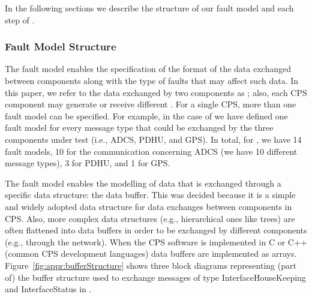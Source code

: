 
In the following sections we describe the structure of our fault model and each step of \APPR.



\subsubsection{Fault Model Structure}
\label{sec:faultModelStructure}





The \APPR fault model enables the specification of the format of the data exchanged between components along with the type of faults that may affect such data. 
In this paper, we refer to the data exchanged by two components as ; also, each CPS component may generate or receive different .
For a single CPS, more than one fault model can be specified. For example, in the case of \ESAIL{} we have defined one fault model for every message type that could be exchanged by the three components under test (i.e., ADCS, PDHU, and GPS). In total, for \ESAIL, we have 14 fault models, 10 for the communication concerning ADCS (we have 10 different message types), 3 for PDHU, and 1 for GPS.

The \APPR fault model enables the modelling of data that is exchanged through a specific data structure: the data buffer. This was decided because it is a simple and widely adopted data structure for data exchanges between components in CPS. Also, more complex data structures (e.g., hierarchical ones like trees) are often flattened into data buffers in order to be exchanged by different components (e.g., through the network). When the CPS software is implemented in C or C++ (common CPS development languages) data buffers are implemented as arrays. Figure~\ref{fig:appr:bufferStructure} shows three block diagrams representing (part of) the buffer structure used to exchange messages of type InterfaceHouseKeeping and InterfaceStatus in \ESAIL.

